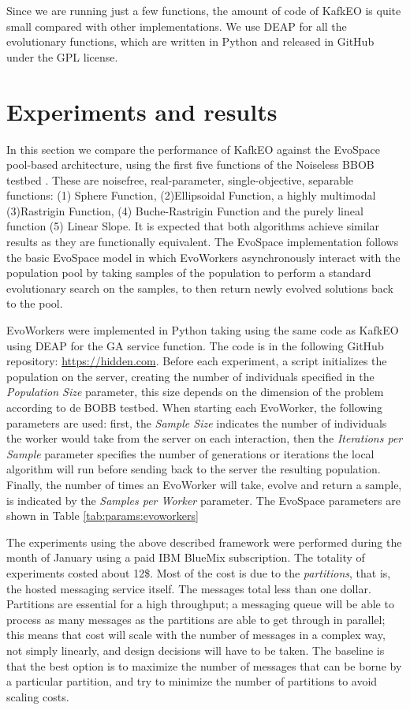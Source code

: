 \documentclass[sigconf]{acmart}
\begin{document}
Since we are running just a few functions, the amount of code of KafkEO
is quite small compared with other implementations. We use DEAP for
all the evolutionary functions, which are written in Python and
released in GitHub under the GPL license.

\section{Experiments and results}
\label{sec:res}
In this section we compare the performance of KafkEO against 
the EvoSpace \cite{GValdez2015}  pool-based architecture, using the first five
functions of the Noiseless BBOB testbed \cite{hansen2016coco}. 
These are noisefree, real-parameter, single-objective, separable functions: (1)
Sphere Function, (2)Ellipsoidal Function, a highly multimodal (3)Rastrigin 
Function, (4) Buche-Rastrigin Function and the purely lineal function (5) 
Linear Slope. It is expected that both algorithms achieve similar results as 
they are functionally equivalent. The EvoSpace implementation follows the 
basic EvoSpace model in which EvoWorkers  asynchronously interact with the
population pool by taking samples of the population to perform a standard
evolutionary search on the samples, to then return newly evolved solutions back
to the pool.  

EvoWorkers were implemented in Python taking using the same code as KafkEO using DEAP \cite{fortin2012deap} for the GA service function. The code is in the
following GitHub repository: \url{https://hidden.com}. Before each
experiment, a script initializes the population on the server, creating the
number of individuals specified in the {\em Population Size} parameter, this
size  depends on the dimension of the problem according to de BOBB testbed. 
When starting each EvoWorker, the following parameters are used: first, the
{\em Sample Size} indicates the number of individuals the worker would take
from the server on each interaction, then the {\em Iterations per Sample} 
parameter specifies the number of generations or iterations the local algorithm
will run before sending back to the server the resulting population. Finally,
the number of times an  EvoWorker will take, evolve and return a sample, is 
indicated by the {\em Samples per Worker} parameter. The EvoSpace parameters are shown in Table \ref{tab:params:evoworkers} 

The experiments using the above described framework were performed
during the month of January using a paid IBM BlueMix subscription. The
totality of experiments costed about 12\$. Most of the cost is due to
the {\em partitions}, that is, the hosted messaging service
itself. The messages total less than one dollar. Partitions are
essential for a high throughput; a messaging queue will be able to
process as many messages as the partitions are able to get through in
parallel; this means that cost will scale with the number of messages
in a complex way, not simply linearly, and design decisions will have
to be taken. The baseline is that the best option is to maximize the
number of messages that can be borne by a particular partition, and
try to minimize the number of partitions to avoid scaling costs. 
\end{document}
